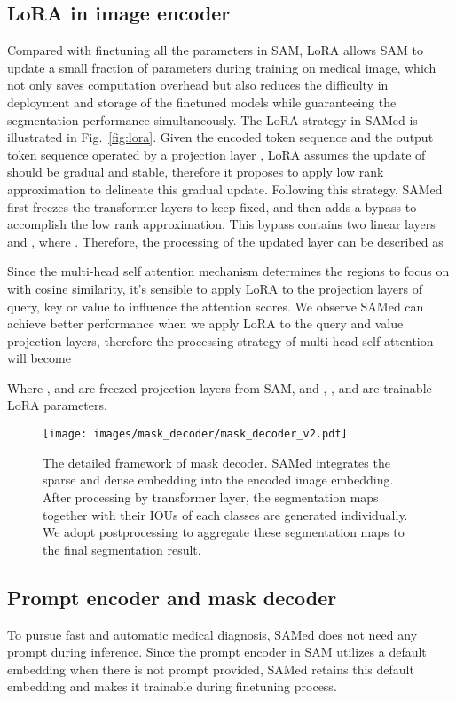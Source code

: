 \documentclass[runningheads]{llncs}
\begin{document}
\subsection{LoRA in image encoder} Compared with finetuning all the parameters in SAM, LoRA allows SAM to update a small fraction of parameters during training on medical image, which not only saves computation overhead but also reduces the difficulty in deployment and storage of the finetuned models while guaranteeing the segmentation performance simultaneously. The LoRA strategy in SAMed is illustrated in Fig.~\ref{fig:lora}. Given the encoded token sequence  and the output token sequence  operated by a projection layer , LoRA assumes the update of  should be gradual and stable, therefore it proposes to apply low rank approximation to delineate this gradual update. Following this strategy, SAMed first freezes the transformer layers to keep  fixed, and then adds a bypass to accomplish the low rank approximation. This bypass contains two linear layers  and , where . Therefore, the processing of the updated layer  can be described as


Since the multi-head self attention mechanism determines the regions to focus on with cosine similarity, it's sensible to apply LoRA to the projection layers of query, key or value to influence the attention scores. We observe SAMed can achieve better performance when we apply LoRA to the query and value projection layers, therefore the processing strategy of multi-head self attention will become


Where ,  and  are freezed projection layers from SAM, and , ,  and  are trainable LoRA parameters.

\begin{figure*}[t]
\begin{center}
\texttt{[image: images/mask\_decoder/mask\_decoder\_v2.pdf]}
\end{center}
   \caption{The detailed framework of mask decoder. SAMed integrates the sparse and dense embedding into the encoded image embedding. After processing by transformer layer, the segmentation maps together with their IOUs of each classes are generated individually. We adopt postprocessing to aggregate these segmentation maps to the final segmentation result.}
\label{fig:mask_decoder}
\end{figure*}

\subsection{Prompt encoder and mask decoder} To pursue fast and automatic medical diagnosis, SAMed does not need any prompt during inference. Since the prompt encoder in SAM utilizes a default embedding when there is not prompt provided, SAMed retains this default embedding and makes it trainable during finetuning process.
\end{document}

